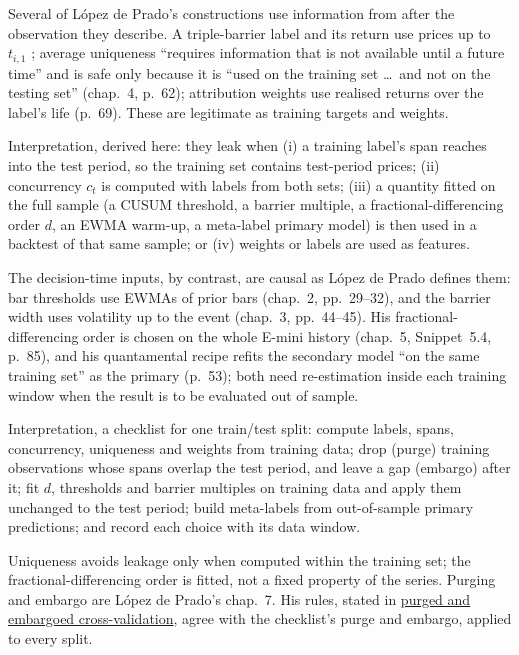 \begin{qfpitfall}\label{pit:label-weight-leakage}
 Several of López de Prado's constructions use information from after the observation they describe. A triple-barrier label and its return use prices up to $t_{i,1}$ \citep[chap.~3, p.~45]{alpha-afml}; average uniqueness ``requires information that is not available until a future time'' and is safe only because it is ``used on the training set \dots\ and not on the testing set'' (chap.~4, p.~62); attribution weights use realised returns over the label's life (p.~69). These are legitimate as training targets and weights.

Interpretation, derived here: they leak when (i) a training label's span reaches into the test period, so the training set contains test-period prices; (ii) concurrency $c_t$ is computed with labels from both sets; (iii) a quantity fitted on the full sample (a CUSUM threshold, a barrier multiple, a fractional-differencing order $d$, an EWMA warm-up, a meta-label primary model) is then used in a backtest of that same sample; or (iv) weights or labels are used as features.

 The decision-time inputs, by contrast, are causal as López de Prado defines them: bar thresholds use EWMAs of prior bars (chap.~2, pp.~29--32), and the barrier width uses volatility up to the event (chap.~3, pp.~44--45). His fractional-differencing order is chosen on the whole E-mini history (chap.~5, Snippet~5.4, p.~85), and his quantamental recipe refits the secondary model ``on the same training set'' as the primary (p.~53); both need re-estimation inside each training window when the result is to be evaluated out of sample.

 Interpretation, a checklist for one train/test split: compute labels, spans, concurrency, uniqueness and weights from training data; drop (purge) training observations whose spans overlap the test period, and leave a gap (embargo) after it; fit $d$, thresholds and barrier multiples on training data and apply them unchanged to the test period; build meta-labels from out-of-sample primary predictions; and record each choice with its data window.

 Uniqueness avoids leakage only when computed within the training set; the fractional-differencing order is fitted, not a fixed property of the series. Purging and embargo are López de Prado's chap.~7. His rules, stated in \hyperref[meth:purged-embargoed-cross-validation]{purged and embargoed cross-validation}, agree with the checklist's purge and embargo, applied to every split.


\end{qfpitfall}
